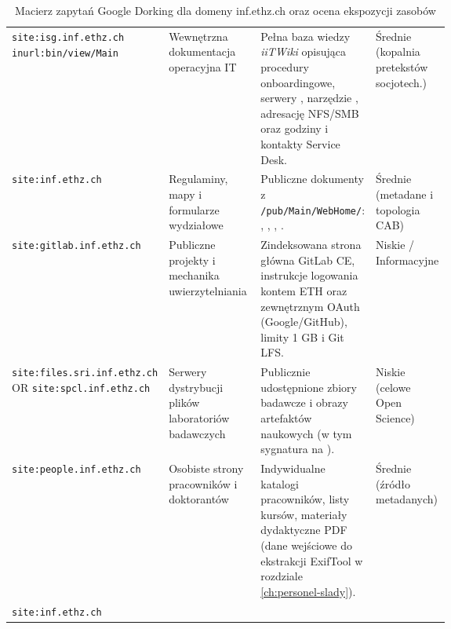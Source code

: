 {{\begin{table}[htbp]
    \centering
    \caption{Macierz zapytań Google Dorking dla domeny inf.ethz.ch oraz ocena ekspozycji zasobów}\label{tab:google-dorking-macierz}
    \tablefont
    \begin{tabularx}{\linewidth}{L{0.27\linewidth} L{0.21\linewidth} Y L{0.17\linewidth}}
        \toprule
         &  &  &  \\
        \midrule
        \nolinkurl{site:isg.inf.ethz.ch} \nolinkurl{inurl:bin/view/Main} &
        Wewnętrzna dokumentacja operacyjna IT &
        Pełna baza wiedzy \textit{iiTWiki} opisująca procedury onboardingowe, serwery , narzędzie , adresację NFS/SMB oraz godziny i kontakty Service Desk. &
        Średnie (kopalnia pretekstów socjotech.) \\
        \midrule
        \nolinkurl{site:inf.ethz.ch}  &
        Regulaminy, mapy i formularze wydziałowe &
        Publiczne dokumenty z \nolinkurl{/pub/Main/WebHome/}: , , , . &
        Średnie (metadane i topologia CAB) \\
        \midrule
        \nolinkurl{site:gitlab.inf.ethz.ch} &
        Publiczne projekty i mechanika uwierzytelniania &
        Zindeksowana strona główna GitLab CE, instrukcje logowania kontem ETH oraz zewnętrznym OAuth (Google/GitHub), limity 1 GB i Git LFS. &
        Niskie / Informacyjne \\
        \midrule
        \nolinkurl{site:files.sri.inf.ethz.ch} OR \nolinkurl{site:spcl.inf.ethz.ch} &
        Serwery dystrybucji plików laboratoriów badawczych &
        Publicznie udostępnione zbiory badawcze i obrazy artefaktów naukowych (w tym sygnatura  na ). &
        Niskie (celowe Open Science) \\
        \midrule
        \nolinkurl{site:people.inf.ethz.ch} &
        Osobiste strony pracowników i doktorantów &
        Indywidualne katalogi  pracowników, listy kursów, materiały dydaktyczne PDF (dane wejściowe do ekstrakcji ExifTool w rozdziale \ref{ch:personel-slady}). &
        Średnie (źródło metadanych) \\
        \midrule
        \nolinkurl{site:inf.ethz.ch}  &

\end{tabularx}
\end{table}}}
